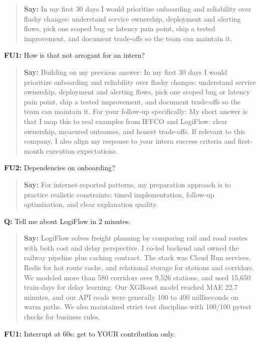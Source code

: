 \documentclass[9pt,a4paper]{article}
\begin{document}
\begin{quote}\small\textbf{Say:} In my first 30 days I would prioritize onboarding and reliability over flashy changes: understand service ownership, deployment and alerting flows, pick one scoped bug or latency pain point, ship a tested improvement, and document trade-offs so the team can maintain it.\end{quote}
\vspace{2mm}
\textbf{FU1:} How is that not arrogant for an intern?

\begin{quote}\small\textbf{Say:} Building on my previous answer: In my first 30 days I would prioritize onboarding and reliability over flashy changes: understand service ownership, deployment and alerting flows, pick one scoped bug or latency pain point, ship a tested improvement, and document trade-offs so the team can maintain it. For your follow-up specifically: My short answer is that I map this to real examples from IFFCO and LogiFlow: clear ownership, measured outcomes, and honest trade-offs. If relevant to this company, I also align my response to your intern success criteria and first-month execution expectations.\end{quote}
\vspace{2mm}
\textbf{FU2:} Dependencies on onboarding?

\begin{quote}\small\textbf{Say:} For internet-reported patterns, my preparation approach is to practice realistic constraints: timed implementation, follow-up optimization, and clear explanation quality.\end{quote}
\vspace{2mm}
\textbf{Q:} Tell me about LogiFlow in 2 minutes.

\begin{quote}\small\textbf{Say:} LogiFlow solves freight planning by comparing rail and road routes with both cost and delay perspective. I co-led backend and owned the railway pipeline plus caching contract. The stack was Cloud Run services, Redis for hot route cache, and relational storage for stations and corridors. We modeled more than 580 corridors over 9,526 stations, and used 15,650 train-days for delay learning. Our XGBoost model reached MAE 22.7 minutes, and our API reads were generally 100 to 400 milliseconds on warm paths. We also maintained strict test discipline with 100/100 pytest checks for business rules.\end{quote}
\vspace{2mm}
\textbf{FU1:} Interrupt at 60s: get to YOUR contribution only.
\end{document}

